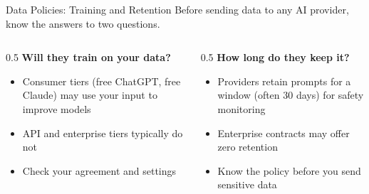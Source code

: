 \documentclass[aspectratio=169]{beamer}
\begin{document}
\begin{frame}{Data Policies: Training and Retention}
Before sending data to any AI provider, know the answers to two questions.
\vspace{0.3cm}
\begin{columns}[T]
\begin{column}{0.5\textwidth}
\textbf{Will they train on your data?}
\begin{itemize}\small
  \item \alert{Consumer tiers} (free ChatGPT, free Claude) may use your input to improve models
  \item \alert{API and enterprise tiers} typically do not
  \item Check your agreement and settings
\end{itemize}
\end{column}
\begin{column}{0.5\textwidth}
\textbf{How long do they keep it?}
\begin{itemize}\small
  \item Providers retain prompts for a window (often 30 days) for safety monitoring
  \item Enterprise contracts may offer zero retention
  \item Know the policy \alert{before} you send sensitive data
\end{itemize}
\end{column}
\end{columns}
\end{frame}
\end{document}

